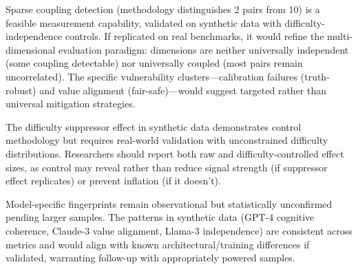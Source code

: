 Sparse coupling detection (methodology distinguishes 2 pairs from 10) is a feasible measurement capability, validated on synthetic data with difficulty-independence controls. If replicated on real benchmarks, it would refine the multi-dimensional evaluation paradigm: dimensions are neither universally independent (some coupling detectable) nor universally coupled (most pairs remain uncorrelated). The specific vulnerability clusters---calibration failures (truth-robust) and value alignment (fair-safe)---would suggest targeted rather than universal mitigation strategies.

The difficulty suppressor effect in synthetic data demonstrates control methodology but requires real-world validation with unconstrained difficulty distributions. Researchers should report both raw and difficulty-controlled effect sizes, as control may reveal rather than reduce signal strength (if suppressor effect replicates) or prevent inflation (if it doesn't).

Model-specific fingerprints remain observational but statistically unconfirmed pending larger samples. The patterns in synthetic data (GPT-4 cognitive coherence, Claude-3 value alignment, Llama-3 independence) are consistent across metrics and would align with known architectural/training differences if validated, warranting follow-up with appropriately powered samples.
